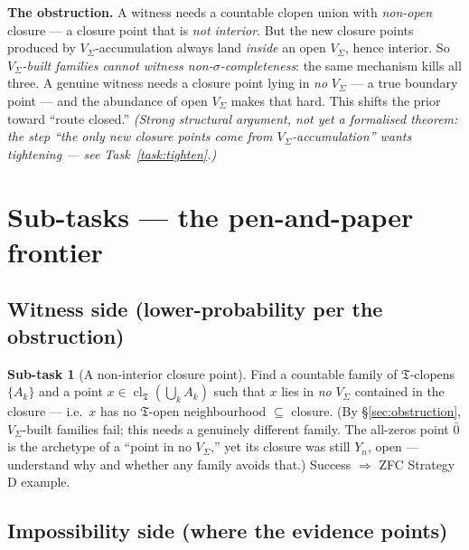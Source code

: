 \documentclass[11pt]{article}
\theoremstyle{definition}
\newtheorem{task}{Sub-task}
\theoremstyle{remark}
\newcommand{\cl}{\operatorname{cl}}
\newcommand{\Y}{Y_n}
\newcommand{\T}{\mathfrak{T}}
\begin{document}
\begin{mdframed}[backgroundcolor=black!4,linewidth=0.4pt]
\textbf{The obstruction.} A witness needs a countable clopen union with
\emph{non-open} closure --- a closure point that is \emph{not interior}. But the
new closure points produced by $V_\Sigma$-accumulation always land \emph{inside} an
open $V_\Sigma$, hence interior. So \emph{$V_\Sigma$-built families cannot witness
non-$\sigma$-completeness}: the same mechanism kills all three. A genuine witness
needs a closure point lying in \emph{no} $V_\Sigma$ --- a true boundary point ---
and the abundance of open $V_\Sigma$ makes that hard. This shifts the prior toward
``route closed.'' \emph{(Strong structural argument, not yet a formalised theorem:
the step ``the only new closure points come from $V_\Sigma$-accumulation'' wants
tightening --- see Task~\ref{task:tighten}.)}
\end{mdframed}

\section{Sub-tasks --- the pen-and-paper frontier}\label{sec:tasks}

\subsection*{Witness side (lower-probability per the obstruction)}

\begin{task}[A non-interior closure point]\label{task:witness}
Find a countable family of $\T$-clopens $\{A_k\}$ and a point
$x\in\cl_\T(\bigcup_k A_k)$ such that $x$ lies in \emph{no} $V_\Sigma$ contained in
the closure --- i.e.\ $x$ has no $\T$-open neighbourhood $\subseteq$ closure.
(By \S\ref{sec:obstruction}, $V_\Sigma$-built families fail; this needs a
genuinely different family. The all-zeros point $\bar0$ is the archetype of a
``point in no $V_\Sigma$,'' yet its closure was still $\Y$, open --- understand why
and whether any family avoids that.) Success $\Rightarrow$ ZFC Strategy D example.
\end{task}

\subsection*{Impossibility side (where the evidence points)}
\end{document}

